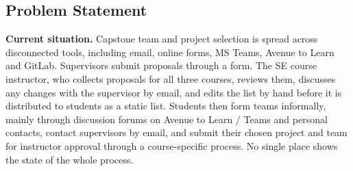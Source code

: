 \documentclass[12pt]{article}
\begin{document}
  \subsection{Problem Statement}

  \label{sec:problem-statement}


  \textbf{Current situation.} Capstone team and project selection is spread across disconnected
  tools, including email, online forms, MS Teams, Avenue to Learn and GitLab.
  Supervisors submit proposals through a form. The SE course instructor, who collects proposals for all
  three courses, reviews them, discusses any changes with the supervisor by email, and edits the list by hand
  before it is distributed to students as a static list.
  Students then form teams informally, mainly through discussion
  forums on Avenue to Learn / Teams and personal contacts, contact supervisors by email, and
  submit their chosen project and team for instructor approval through a course-specific process.
  No single place shows the state of the whole process.
\end{document}
